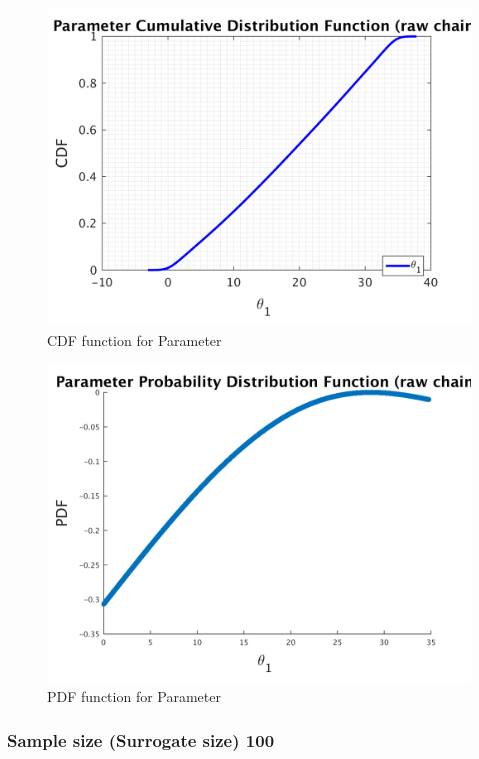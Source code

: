\begin{figure}[h!]
  
  \centering
   \includegraphics[scale=0.75]{output_50/simple_ip_cdf_raw}
   \caption{CDF function for Parameter }
\end{figure}



\begin{figure}[h!]
  
  \centering
   \includegraphics[scale=0.75]{output_50/ip_logLike_unified}
   \caption{PDF function for Parameter }
\end{figure}



\subsubsection{Sample size (Surrogate size) 100 }


